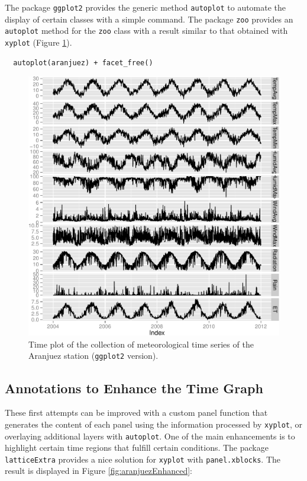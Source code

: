 \documentclass[smallroyalvopaper]{memoir}
\begin{document}
The package \texttt{ggplot2} provides the generic method \texttt{autoplot} to
automate the display of certain classes with a simple command. The
package \texttt{zoo} provides an \texttt{autoplot} method for the \texttt{zoo} class with a
result similar to that obtained with \texttt{xyplot} (Figure \ref{fig:org576aec7}).

\lstset{language=r,label= ,caption= ,captionpos=b,numbers=none}
\begin{lstlisting}
  autoplot(aranjuez) + facet_free()
\end{lstlisting}

\begin{figure}[htbp]
\centering
\includegraphics[width=.9\linewidth]{figs/aranjuezGG.pdf}
\caption{\label{fig:org576aec7}
Time plot of the collection of meteorological time series of the Aranjuez station (\texttt{ggplot2} version).}
\end{figure}

\subsection{\floweroneleft Annotations to Enhance the Time Graph}
\label{sec:orgd4b61c5}

These first attempts can be improved with a custom panel function
that generates the content of each panel using the information
processed by \texttt{xyplot}, or overlaying additional layers with
\texttt{autoplot}.  One of the main enhancements is to highlight certain time
regions that fulfill certain conditions. The package \texttt{latticeExtra}
provides a nice solution for \texttt{xyplot} with \texttt{panel.xblocks}. The result
is displayed in Figure \ref{fig:aranjuezEnhanced}:
\end{document}
